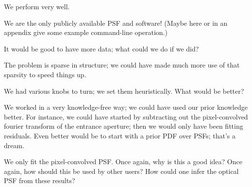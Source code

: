 \documentclass[12pt,letterpaper,preprint]{aastex}
\begin{document}
We perform very well.

We are the only publicly available PSF and software!
(Maybe here or in an appendix give some example command-line operation.)

It would be good to have more data;
  what could we do if we did?

The problem is sparse in structure;
  we could have made much more use of that sparsity to speed things up.

We had various knobs to turn; we set them heuristically.
What would be better?

We worked in a very knowledge-free way;
  we could have used our prior knowledge better.
For instance, we could have started by subtracting out the pixel-convolved fourier transform of the entrance aperture;
  then we would only have been fitting residuals.
Even better would be to start with a prior PDF over PSFs;
  that's a dream.

We only fit the pixel-convolved PSF.
Once again, why is this a good idea?
Once again, how should this be used by other users?
How could one infer the optical PSF from these results?
\end{document}
